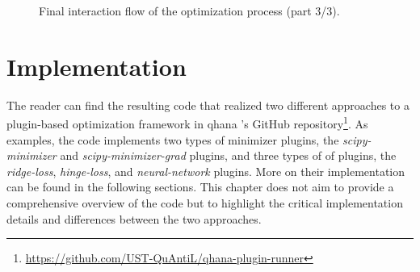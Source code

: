 \documentclass[
  a4paper,  %
  twoside,  %
  bibliography=totoc,
  headsepline,
  cleardoublepage=empty,
  parskip=half,
  draft=false
]{scrbook}
\begin{document}
\begin{figure}[p]
  \centering
  \checkoddpage
  \ifoddpage
  \else
  \fi
  \caption{Final interaction flow of the optimization process (part 3/3).}
  \label{fig:interaction_flow_part3}
\end{figure}




\chapter{Implementation}
\label{chap:implementation}

The reader can find the resulting code that realized two different approaches to a plugin-based optimization framework in \gls{qhana} 's GitHub repository\footnote{\url{https://github.com/UST-QuAntiL/qhana-plugin-runner}}.
As examples, the code implements two types of minimizer plugins, the \emph{scipy-minimizer} and \emph{scipy-minimizer-grad} plugins, and three types of \gls{of} plugins, the \emph{ridge-loss}, \emph{hinge-loss}, and \emph{neural-network} plugins.
More on their implementation can be found in the following sections.
This chapter does not aim to provide a comprehensive overview of the code but to highlight the critical implementation details and differences between the two approaches.
\end{document}
